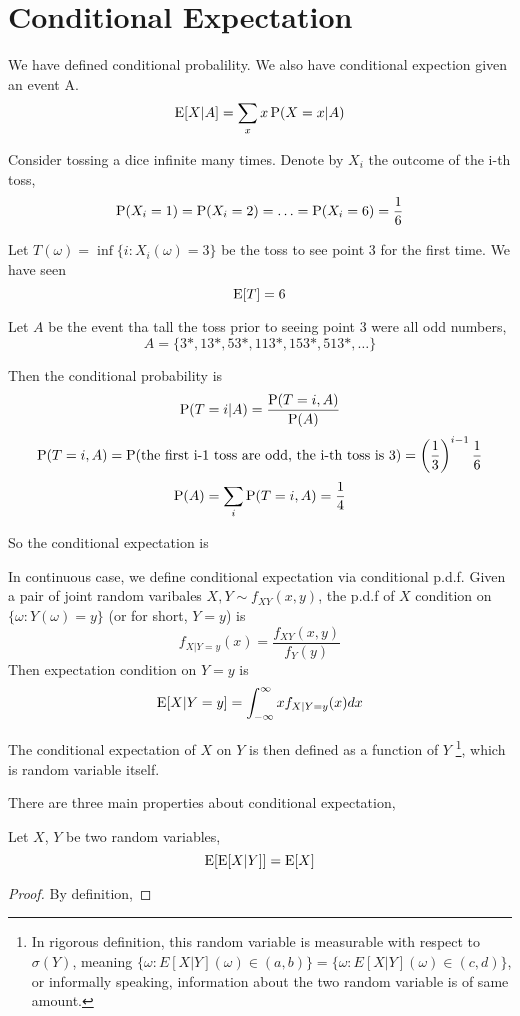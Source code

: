 \section{Conditional Expectation}
We have defined conditional probalility. We also have conditional expection given an event A.
$$\E[X|A] = \sum_x x\P(X=x | A)$$
\begin{exmp}{}
	Consider tossing a dice infinite many times. Denote by $X_i$ the outcome of the i-th toss,
	$$\P(X_i = 1) = \P(X_i = 2) = \ldots =\P(X_i = 6) = \frac{1}{6}$$
	
	Let $T(\omega)=\inf \{i: X_i(\omega) = 3\}$ be the toss to see point 3 for the first time. We have seen
	$$\E[T] = 6$$
	
	Let $A$ be the event tha tall the toss prior to seeing point 3 were all odd numbers,
	$$A=\{3*, 13*, 53*, 113*, 153*, 513*,\ldots\}$$
	
	Then the conditional probability is 
	$$\P(T=i | A) = \frac{\P(T = i, A)}{\P(A)}$$
	$$\P(T=i, A) = \P(\textrm{the first i-1 toss are odd, the i-th toss is 3}) = \left( \frac{1}{3} \right)^{i-1} \frac{1}{6}$$
	$$\P(A) = \sum_i \P(T=i, A) =\frac{1}{4}$$
	
	So the conditional expectation is 
\end{exmp}

In continuous case, we define conditional expectation via conditional p.d.f. Given a pair of joint random varibales $X, Y\sim f_{XY}(x,y)$, the p.d.f of $X$ condition on $\{\omega: Y(\omega) = y \}$ (or for short, $Y=y$) is
$$f_{X|Y=y}(x) = \frac{f_{XY}(x, y)}{f_Y(y)}$$
Then expectation condition on $Y=y$ is
$$\E[X|Y=y] = \int_{-\infty}^{\infty} xf_{X|Y=y}(x)dx$$

The conditional expectation of $X$ on $Y$ is then defined as a function of $Y$ \footnote{In rigorous definition, this random variable is measurable with respect to $\sigma(Y)$, meaning $\{\omega: E[X|Y](\omega) \in (a, b) \} = \{\omega: E[X|Y](\omega) \in (c, d) \}$, or informally speaking, information about the two random variable is of same amount.}, which is random variable itself.


There are three main properties about conditional expectation,
\begin{lemma}
	Let $X$, $Y$ be two random variables,
	$$\E[\E[X|Y]] = \E[X]$$
\end{lemma}
\begin{proof}
	By definition,
\end{proof}

